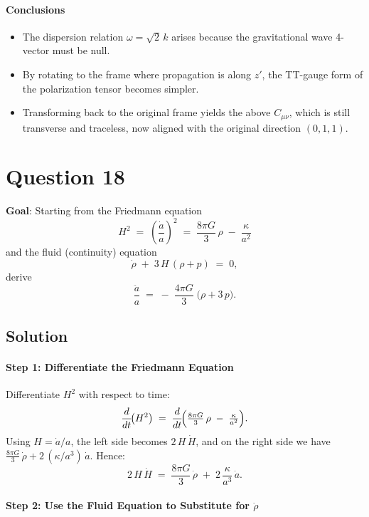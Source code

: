 \documentclass{article}
\begin{document}
\bigskip

\paragraph{Conclusions}

\begin{itemize}
  \item The dispersion relation $\omega = \sqrt{2}\,k$ arises because the gravitational wave 4-vector must be null.
  \item By rotating to the frame where propagation is along $z'$, the TT-gauge form of the polarization tensor becomes simpler.
  \item Transforming back to the original frame yields the above $C_{\mu\nu}$, which is still transverse and traceless, now aligned with the original direction $(0,1,1)$.
\end{itemize}

\pagebreak

\section*{Question 18}
\noindent
\textbf{Goal}: Starting from the Friedmann equation
\[
H^{2} \;=\; \left(\frac{\dot{a}}{a}\right)^{2}
\;=\;\frac{8\pi G}{3}\,\rho \;-\;\frac{\kappa}{a^{2}}
\]
and the fluid (continuity) equation
\[
\dot{\rho} \;+\;3\,H\,(\rho + p)\;=\;0,
\]
derive
\[
\frac{\ddot{a}}{a}
\;=\;
-\;\frac{4\pi G}{3}\;\bigl(\rho + 3\,p\bigr).
\]

\subsection*{Solution}
\paragraph{Step 1: Differentiate the Friedmann Equation}

Differentiate \(H^2\) with respect to time:
\[
\frac{d}{dt}\!\bigl(H^2\bigr)
\;=\;\frac{d}{dt}\!\Bigl(\tfrac{8\pi G}{3}\,\rho \;-\;\tfrac{\kappa}{a^2}\Bigr).
\]
Using \(H = \dot{a}/a\), the left side becomes \(2\,H\,\dot{H}\), and on the right side we have
\(\tfrac{8\pi G}{3}\,\dot{\rho} + 2\,(\kappa/a^3)\,\dot{a}.\)
Hence:
\[
2\,H\,\dot{H}
\;=\;
\frac{8\pi G}{3}\,\dot{\rho}
\;+\;
2\,\frac{\kappa}{a^3}\,\dot{a}.
\]

\paragraph{Step 2: Use the Fluid Equation to Substitute for \(\dot{\rho}\)}
\end{document}
